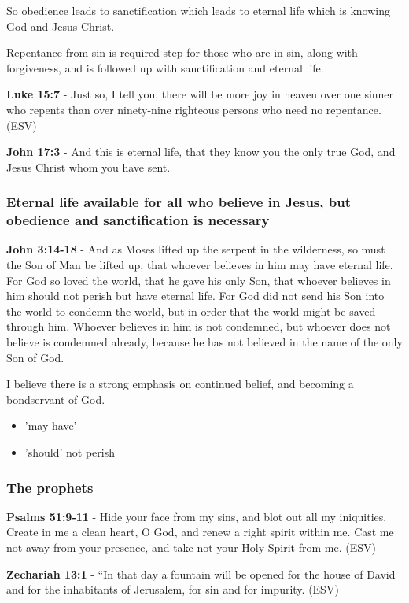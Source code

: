 \documentclass[11pt]{article}
\begin{document}
So obedience leads to sanctification which leads to eternal life which is knowing God and Jesus Christ.

Repentance from sin is required step for those who are in sin, along with forgiveness, and is followed up with sanctification and eternal life.

\textbf{Luke 15:7} - Just so, I tell you, there will be more joy in heaven over one sinner who repents than over ninety-nine righteous persons who need no repentance.  (ESV)

\textbf{John 17:3} - And this is eternal life, that they know you the only true God, and Jesus Christ whom you have sent.

\subsubsection{Eternal life \textbf{available} for all who believe in Jesus, but obedience and sanctification is necessary}
\label{sec:org53eaa1e}
\textbf{John 3:14-18} - And as Moses lifted up the serpent in the wilderness, so must the Son of Man be lifted up, that whoever believes in him may have eternal life.  For God so loved the world, that he gave his only Son, that whoever believes in him should not perish but have eternal life.  For God did not send his Son into the world to condemn the world, but in order that the world might be saved through him.  Whoever believes in him is not condemned, but whoever does not believe is condemned already, because he has not believed in the name of the only Son of God.

I believe there is a strong emphasis on continued belief, and becoming a bondservant of God.
\begin{itemize}
\item 'may have'
\item 'should' not perish
\end{itemize}

\subsubsection{The prophets}
\label{sec:orgfcce0c2}
\textbf{Psalms 51:9-11} - Hide your face from my sins, and blot out all my iniquities. Create in me a clean heart, O God, and renew a right spirit within me. Cast me not away from your presence, and take not your Holy Spirit from me. (ESV)

\textbf{Zechariah 13:1} - “In that day a fountain will be opened for the house of David and for the inhabitants of Jerusalem, for sin and for impurity. (ESV)
\end{document}
